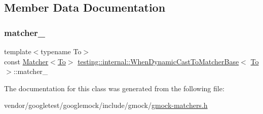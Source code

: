 \subsection{Member Data Documentation}
\mbox{\label{classtesting_1_1internal_1_1_when_dynamic_cast_to_matcher_base_a40d697407c960bee8fe3b125f5ac8730}} 
\subsubsection{\texorpdfstring{matcher\+\_\+}{matcher\_}}
{\footnotesize\ttfamily template$<$typename To$>$ \\
const \hyperlink{classtesting_1_1_matcher}{Matcher}$<$\hyperlink{classtesting_1_1internal_1_1_to}{To}$>$ \hyperlink{classtesting_1_1internal_1_1_when_dynamic_cast_to_matcher_base}{testing\+::internal\+::\+When\+Dynamic\+Cast\+To\+Matcher\+Base}$<$ \hyperlink{classtesting_1_1internal_1_1_to}{To} $>$\+::matcher\+\_\+\hspace{0.3cm}{\ttfamily [protected]}}



The documentation for this class was generated from the following file\+:\begin{DoxyCompactItemize}
\item 
vendor/googletest/googlemock/include/gmock/\hyperlink{gmock-matchers_8h}{gmock-\/matchers.\+h}\end{DoxyCompactItemize}
